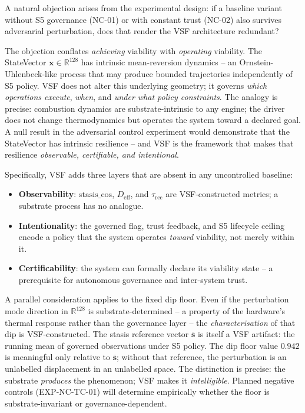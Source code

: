 \documentclass[11pt, a4paper]{article}
\begin{document}
A natural objection arises from the experimental design: if a baseline
variant without S5 governance (NC-01) or with constant trust (NC-02) also
survives adversarial perturbation, does that render the VSF architecture
redundant?

The objection conflates \emph{achieving} viability with \emph{operating}
viability.
The StateVector $\mathbf{x} \in \mathbb{R}^{128}$ has intrinsic mean-reversion
dynamics -- an Ornstein-Uhlenbeck-like process that may produce bounded
trajectories independently of S5 policy.
VSF does not alter this underlying geometry; it governs \emph{which operations
execute}, \emph{when}, and \emph{under what policy constraints}.
The analogy is precise: combustion dynamics are substrate-intrinsic to any
engine; the driver does not change thermodynamics but operates the system toward
a declared goal.
A null result in the adversarial control experiment would demonstrate that the
StateVector has intrinsic resilience -- and VSF is the framework that makes that
resilience \emph{observable, certifiable, and intentional}.

Specifically, VSF adds three layers that are absent in any uncontrolled baseline:
\begin{itemize}
  \item \textbf{Observability}: $\text{stasis\_cos}$, $D_\text{eff}$, and
        $\tau_\text{rec}$ are VSF-constructed metrics; a substrate process has
        no analogue.
  \item \textbf{Intentionality}: the governed flag, trust feedback, and S5
        lifecycle ceiling encode a policy that the system operates \emph{toward}
        viability, not merely within it.
  \item \textbf{Certificability}: the system can formally declare its viability
        state -- a prerequisite for autonomous governance and inter-system trust.
\end{itemize}

A parallel consideration applies to the fixed dip floor.
Even if the perturbation mode direction in $\mathbb{R}^{128}$ is
substrate-determined -- a property of the hardware's thermal response rather
than the governance layer -- the \emph{characterisation} of that dip is
VSF-constructed.
The stasis reference vector $\bar{\mathbf{s}}$ is itself a VSF artifact:
the running mean of governed observations under S5 policy.
The dip floor value $0.942$ is meaningful only relative to $\bar{\mathbf{s}}$;
without that reference, the perturbation is an unlabelled displacement in an
unlabelled space.
The distinction is precise: the substrate \emph{produces} the phenomenon;
VSF makes it \emph{intelligible}.
Planned negative controls (EXP-NC-TC-01) will determine empirically whether
the floor is substrate-invariant or governance-dependent.
\end{document}
